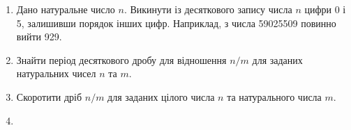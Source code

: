 \documentclass[a5paper,titlepage,openany,twoside,
]
{book_unv}%
\makeatletter
\newcommand{\xslalph}[1]{\expandafter\@xslalph\csname c@#1\endcsname}
\newcommand{\@xslalph}[1]{%
    \ifcase#1\or а\or б\or в\or г\or д\or e\or є\or ж\or з\or i%
    \or й\or к\or л\or м\or н\or о\or п\or р\or с\or т%
    \or у\or ф\or х\or ц\or ч\or ш\or ю\or я\or аа\or бб\or вв%
    \else\@ctrerr\fi%
}
\makeatother
\begin{document}
\begin{enumerate}
\begin{enumerate}[label=\xslalph*)]

\item \(\max(\left| z_{1} \right|,\ldots,\left| z_{n} \right|),\) де
\(z_{i} = \left\{ \begin{matrix}
y_{i},\textup{ при }\;\left| y_{i} \right| \leq 2, \\
0.5,\textup{у інших випадках} \\
\end{matrix} \right.\ \);
\item \(\min(\left| z_{1} \right|,\ldots,\left| z_{n} \right|),\) де
\(z_{i} = \left\{ \begin{matrix}
 y_{i},\textup{при}\;\left| y_{i} \right| \geq 1, \\
 2,\textup{у інших випадках} \\
\end{matrix} \right.\ \);
\item \(z_{1} + z_{2} + \ldots + z_{n},\) де
\(z_{i} = \left\{ \begin{matrix}
 y_{i},\textup{при} \; {y}_{i} < 10, \\
 1,\textup{у інших випадках} \\
\end{matrix} \right.\ \)
 \end{enumerate}

\item
  Дано натуральне число $n$. Викинути із десяткового
 запису числа $n$ цифри 0 і 5, залишивши порядок інших цифр.
 Наприклад, з числа 59025509 повинно вийти 929.
\item
  Знайти період десяткового дробу для відношення $n/m$ для заданих
  натуральних чисел $n$ та $m$.
\item
  Скоротити дріб $n/m$ для заданих цілого числа $n$ та натурального числа $m$.
\item 
 

\end{enumerate}
\end{document}
